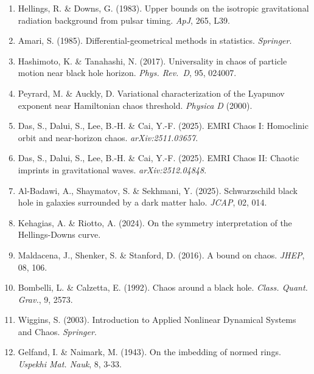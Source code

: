 \documentclass[
]{article}
\providecommand{\tightlist}{%
  \setlength{\itemsep}{0pt}\setlength{\parskip}{0pt}}
\begin{document}
\begin{enumerate}
\def\labelenumi{\arabic{enumi}.}
\tightlist
\item
  Hellings, R. \& Downs, G. (1983). Upper bounds on the isotropic
  gravitational radiation background from pulsar timing. \emph{ApJ},
  265, L39.
\item
  Amari, S. (1985). Differential-geometrical methods in statistics.
  \emph{Springer}.
\item
  Hashimoto, K. \& Tanahashi, N. (2017). Universality in chaos of
  particle motion near black hole horizon. \emph{Phys. Rev.~D}, 95,
  024007.
\item
  Peyrard, M. \& Auckly, D. Variational characterization of the Lyapunov
  exponent near Hamiltonian chaos threshold. \emph{Physica D} (2000).
\item
  Das, S., Dalui, S., Lee, B.-H. \& Cai, Y.-F. (2025). EMRI Chaos I:
  Homoclinic orbit and near-horizon chaos. \emph{arXiv:2511.03657}.
\item
  Das, S., Dalui, S., Lee, B.-H. \& Cai, Y.-F. (2025). EMRI Chaos II:
  Chaotic imprints in gravitational waves. \emph{arXiv:2512.04848}.
\item
  Al-Badawi, A., Shaymatov, S. \& Sekhmani, Y. (2025). Schwarzschild
  black hole in galaxies surrounded by a dark matter halo. \emph{JCAP},
  02, 014.
\item
  Kehagias, A. \& Riotto, A. (2024). On the symmetry interpretation of
  the Hellings-Downs curve.
\item
  Maldacena, J., Shenker, S. \& Stanford, D. (2016). A bound on chaos.
  \emph{JHEP}, 08, 106.
\item
  Bombelli, L. \& Calzetta, E. (1992). Chaos around a black hole.
  \emph{Class. Quant. Grav.}, 9, 2573.
\item
  Wiggins, S. (2003). Introduction to Applied Nonlinear Dynamical
  Systems and Chaos. \emph{Springer}.
\item
  Gelfand, I. \& Naimark, M. (1943). On the imbedding of normed rings.
  \emph{Uspekhi Mat. Nauk}, 8, 3-33.
\end{enumerate}
\end{document}
